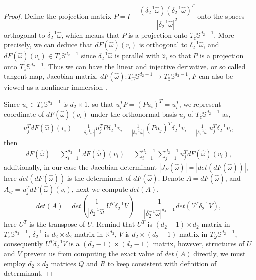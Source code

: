 \documentclass[11pt,reqno]{amsart}
\numberwithin{equation}{section}
\newcommand{\R}{\mathbb{R}}
\newcommand{\s}{\mathbb{S}}
\newcommand{\om}{\omega}
\newcommand{\de}{\delta}
\begin{document}
\begin{proof}
Define the projection matrix $P=I-\dfrac{(\de^{-1}_2\hat{\om})(\de^{-1}_2\hat{\om})^T}{|\de^{-1}_2\hat{\om}|^{2}} $ onto the spaces orthogonal to $\de^{-1}_2\hat{\om}$, which means that $P$ is a projection onto $T_{\hat{z}}\s^{d_2-1}$. More precisely, %
we can deduce that $dF(\hat{\om})(v_i)$ is orthogonal to $\de^{-1}_2\hat{\om}$, and $dF(\hat{\om})(v_i)\in T_{\hat{z}}\s^{d_2-1}$ since $\de_{2}^{-1}\hat{\om}$ is parallel with $\hat{z}$, so that $P$ is a projection onto $T_{\hat{z}}\s^{d_2-1}$. Thus we can have the linear and injective derivative, or so called tangent map, Jacobian matrix,  $dF({\hat{\om}}):T_{\hat{\om}}\s^{d_2-1}\rightarrow T_{\hat{z}}\s^{d_2-1}$, $F$ can also be viewed as a nonlinear immersion \cite[10, Section 1.3]{JJ}.

Since $u_i\in T_{\hat{z}}\s^{d_2-1}$ is $d_2\times 1$, so that  $u_i^TP=(Pu_i)^T=u_i^T$, we represent coordinate of $dF(\hat{\om})(v_i)$ under the orthonormal basis $u_{j}$ of $T_{\hat{z}}\s^{d_2-1}$ as,
\begin{align*}
	u_j^TdF(\hat{\om})(v_i)=\frac{1}{|\de_{2}^{-1}\hat{\om}|}u_j^TP\de^{-1}_2v_i=\frac{1}{|\de_{2}^{-1}\hat{\om}|}(Pu_j)^T\de^{-1}_2v_i=\frac{1}{|\de_{2}^{-1}\hat{\om}|}u_j^T\de^{-1}_2v_i,
\end{align*}
then 
\begin{align*}
dF(\hat{\om})=\sum_{i=1}^{d_2-1}dF(\hat{\om})(v_i)=\sum_{i=1}^{d_2-1}\sum_{j=1}^{d_2-1}u_j^TdF(\hat{\om})(v_i),
	\end{align*}
additionally, in our case the Jacobian determinant $|J_F(\hat{\om})|=|det(dF({\hat{\om}}))|$, here $det(dF({\hat{\om}}))$ is the determinant of $dF({\hat{\om}})$. Denote $A=dF({\hat{\om}})$, and $A_{ij}=u_j^TdF(\hat{\om})(v_i)$, next we compute $det(A)$,
\begin{equation}\label{det_A}
det(A)=det\left(\frac{1}{|\de_{2}^{-1}\hat{\om}|}U^T\de^{-1}_2V \right)=\frac{1}{|\de_{2}^{-1}\hat{\om}|^{d_2-1}}det\left(U^T\de^{-1}_2V \right),
\end{equation}
here $U^T$ is the transpose of $U$. Remind that $U^T$ is $(d_2-1)\times d_2$ matrix in $T_{\hat{z}}\s^{d_2-1}$,  $\de_{2}^{-1}$ is $d_2\times d_2$ matrix in $\R^{d_2}$, $V$ is $d_2\times (d_2-1)$ matrix in $T_{\hat{\om}}\s^{d_2-1}$, consequently $U^T\de^{-1}_2V$ is a $(d_2-1)\times (d_2-1)$ matrix, however, structures of $U$ and $V$ prevent us from computing the exact value of $det(A)$ directly,
we must employ $d_2\times d_2$ matrices $Q$ and $R$ to keep consistent with definition of determinant. 
 

\end{proof}
\end{document}
